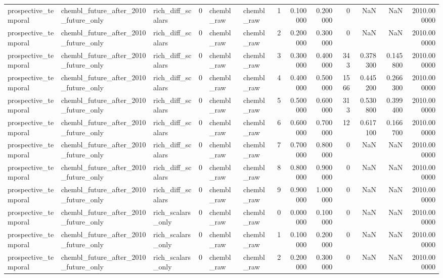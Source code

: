 \begin{longtable}{lllrllrrrrrrr}
prospective\_temporal & chembl\_future\_after\_2010\_future\_only & rich\_diff\_scalars & 0 & chembl\_raw & chembl\_raw & 1 & 0.100000 & 0.200000 & 0 & NaN & NaN & 2010.000000 \\
prospective\_temporal & chembl\_future\_after\_2010\_future\_only & rich\_diff\_scalars & 0 & chembl\_raw & chembl\_raw & 2 & 0.200000 & 0.300000 & 0 & NaN & NaN & 2010.000000 \\
prospective\_temporal & chembl\_future\_after\_2010\_future\_only & rich\_diff\_scalars & 0 & chembl\_raw & chembl\_raw & 3 & 0.300000 & 0.400000 & 343 & 0.378300 & 0.145800 & 2010.000000 \\
prospective\_temporal & chembl\_future\_after\_2010\_future\_only & rich\_diff\_scalars & 0 & chembl\_raw & chembl\_raw & 4 & 0.400000 & 0.500000 & 1566 & 0.445200 & 0.266300 & 2010.000000 \\
prospective\_temporal & chembl\_future\_after\_2010\_future\_only & rich\_diff\_scalars & 0 & chembl\_raw & chembl\_raw & 5 & 0.500000 & 0.600000 & 313 & 0.530800 & 0.399400 & 2010.000000 \\
prospective\_temporal & chembl\_future\_after\_2010\_future\_only & rich\_diff\_scalars & 0 & chembl\_raw & chembl\_raw & 6 & 0.600000 & 0.700000 & 12 & 0.617100 & 0.166700 & 2010.000000 \\
prospective\_temporal & chembl\_future\_after\_2010\_future\_only & rich\_diff\_scalars & 0 & chembl\_raw & chembl\_raw & 7 & 0.700000 & 0.800000 & 0 & NaN & NaN & 2010.000000 \\
prospective\_temporal & chembl\_future\_after\_2010\_future\_only & rich\_diff\_scalars & 0 & chembl\_raw & chembl\_raw & 8 & 0.800000 & 0.900000 & 0 & NaN & NaN & 2010.000000 \\
prospective\_temporal & chembl\_future\_after\_2010\_future\_only & rich\_diff\_scalars & 0 & chembl\_raw & chembl\_raw & 9 & 0.900000 & 1.000000 & 0 & NaN & NaN & 2010.000000 \\
prospective\_temporal & chembl\_future\_after\_2010\_future\_only & rich\_scalars\_only & 0 & chembl\_raw & chembl\_raw & 0 & 0.000000 & 0.100000 & 0 & NaN & NaN & 2010.000000 \\
prospective\_temporal & chembl\_future\_after\_2010\_future\_only & rich\_scalars\_only & 0 & chembl\_raw & chembl\_raw & 1 & 0.100000 & 0.200000 & 0 & NaN & NaN & 2010.000000 \\
prospective\_temporal & chembl\_future\_after\_2010\_future\_only & rich\_scalars\_only & 0 & chembl\_raw & chembl\_raw & 2 & 0.200000 & 0.300000 & 0 & NaN & NaN & 2010.000000 \\

\end{longtable}
